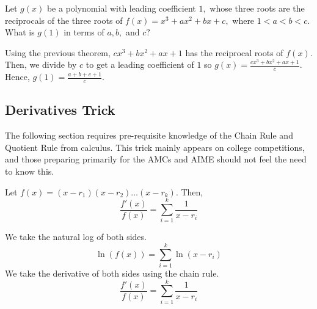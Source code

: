 \documentclass[mast]{lucky}
\begin{document}
\begin{exam}[AMC 12B 2021/16]
Let $g(x)$ be a polynomial with leading coefficient $1,$ whose three roots are the reciprocals of the three roots of $f(x)=x^3+ax^2+bx+c,$ where $1<a<b<c.$ What is $g(1)$ in terms of $a,b,$ and $c?$
\end{exam}

\begin{sol}
Using the previous theorem, $cx^3+bx^2+ax+1$ has the reciprocal roots of $f(x)$. Then, we divide by $c$ to get a leading coefficient of $1$ so $g(x)=\frac{cx^3+bx^2+ax+1}{c}$. Hence, $g(1)=\frac{a+b+c+1}{c}$.
\end{sol}

\newpage

\newpage
\subsection{Derivatives Trick}

The following section requires pre-requisite knowledge of the Chain Rule and Quotient Rule from calculus. This trick mainly appears on college competitions, and those preparing primarily for the AMCs and AIME should not feel the need to know this.

\begin{theo}
Let $f(x)=(x-r_{1})(x-r_{2})\ldots(x-r_{k})$. Then,
$$\frac{f'(x)}{f(x)} = \sum_{i=1}^{k} \frac{1}{x-r_{i}}$$
\end{theo}

\begin{pro}
We take the natural log of both sides.
$$\ln (f(x)) = \sum_{i=1}^{k} \ln(x-r_{i})$$
We take the derivative of both sides using the chain rule.
$$\frac{f'(x)}{f(x)} = \sum_{i=1}^{k} \frac{1}{x-r_{i}}$$
\end{pro}
\end{document}
